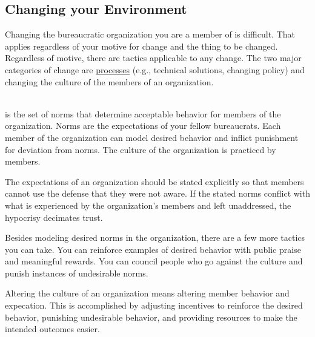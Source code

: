 \subsection*{Changing your Environment}


Changing the bureaucratic organization you are a member of is difficult. That applies regardless of your motive for change and the thing to be changed. Regardless of motive, there are tactics applicable to any change. 
The two major categories of change are 
%
\hyperref[sec:change-a-process]{processes} (e.g., technical solutions, changing policy)
and changing the \gls{culture} of the members of an organization.

\ \\

\iftoggle{glossarysubstitutionworks}{\Gls{culture}}{Culture} is the set of norms that determine acceptable behavior for members of the organization. Norms are the expectations of your fellow bureaucrats. Each member of the organization can model desired behavior and inflict punishment for deviation from norms. The culture of the organization is practiced by members. 

The expectations of an organization should be stated explicitly so that members cannot use the defense that they were not aware. If the stated norms conflict with what is experienced by the organization's members and left unaddressed, the hypocrisy decimates trust. 

Besides modeling desired norms in the organization, there are a few more tactics you can take. 
You can reinforce examples of desired behavior with public praise and meaningful rewards. You can council people who go against the culture and punish instances of undesirable norms. 

Altering the culture of an organization means altering member behavior and expecation. This is accomplished by adjusting incentives to reinforce the desired behavior, punishing undesirable behavior, and providing resources to make the intended outcomes easier. 

